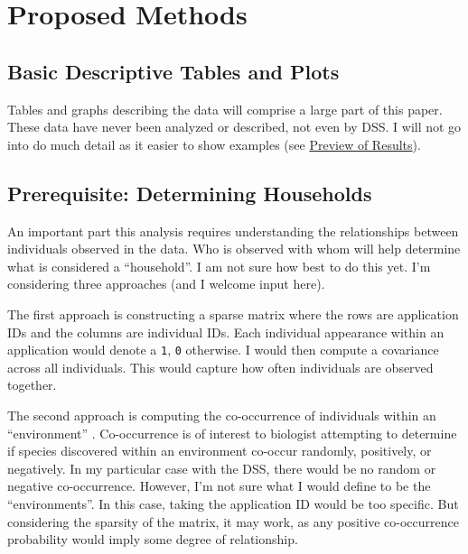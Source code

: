 \documentclass[12pt,letterpaperpaper,]{book}
\begin{document}
\hypertarget{methods-2}{\section*{Proposed Methods}\label{methods-2}}

\subsection*{Basic Descriptive Tables and
Plots}\label{basic-descriptive-tables-and-plots}

Tables and graphs describing the data will comprise a large part of this
paper. These data have never been analyzed or described, not even by
DSS. I will not go into do much detail as it easier to show examples
(see \protect\hyperlink{preview-2}{Preview of Results}).

\subsection*{Prerequisite: Determining
Households}\label{prerequisite-determining-households}

An important part this analysis requires understanding the relationships
between individuals observed in the data. Who is observed with whom will
help determine what is considered a ``household''. I am not sure how
best to do this yet. I'm considering three approaches (and I welcome
input here).

The first approach is constructing a sparse matrix where the rows are
application IDs and the columns are individual IDs. Each individual
appearance within an application would denote a \texttt{1}, \texttt{0}
otherwise. I would then compute a covariance across all individuals.
This would capture how often individuals are observed together.

The second approach is computing the co-occurrence of individuals within
an ``environment'' \citep{griffith_cooccur:_2015}. Co-occurrence is of
interest to biologist attempting to determine if species discovered
within an environment co-occur randomly, positively, or negatively. In
my particular case with the DSS, there would be no random or negative
co-occurrence. However, I'm not sure what I would define to be the
``environments''. In this case, taking the application ID would be too
specific. But considering the sparsity of the matrix, it may work, as
any positive co-occurrence probability would imply some degree of
relationship.
\end{document}
